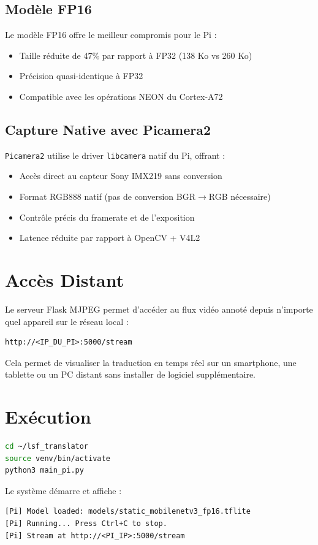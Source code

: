 \subsection{Modèle FP16}

Le modèle FP16 offre le meilleur compromis pour le Pi :
\begin{itemize}
    \item Taille réduite de 47\% par rapport à FP32 (138 Ko vs 260 Ko)
    \item Précision quasi-identique à FP32
    \item Compatible avec les opérations NEON du Cortex-A72
\end{itemize}

\subsection{Capture Native avec Picamera2}

\texttt{Picamera2} utilise le driver \texttt{libcamera} natif du Pi, offrant :
\begin{itemize}
    \item Accès direct au capteur Sony IMX219 sans conversion
    \item Format RGB888 natif (pas de conversion BGR$\rightarrow$RGB nécessaire)
    \item Contrôle précis du framerate et de l'exposition
    \item Latence réduite par rapport à OpenCV + V4L2
\end{itemize}

\section{Accès Distant}

Le serveur Flask MJPEG permet d'accéder au flux vidéo annoté depuis n'importe quel appareil sur le réseau local :

\begin{verbatim}
http://<IP_DU_PI>:5000/stream
\end{verbatim}

Cela permet de visualiser la traduction en temps réel sur un smartphone, une tablette ou un PC distant sans installer de logiciel supplémentaire.

\section{Exécution}

\begin{lstlisting}[style=python, caption={Lancement sur Raspberry Pi}, language=bash]
cd ~/lsf_translator
source venv/bin/activate
python3 main_pi.py
\end{lstlisting}

Le système démarre et affiche :
\begin{verbatim}
[Pi] Model loaded: models/static_mobilenetv3_fp16.tflite
[Pi] Running... Press Ctrl+C to stop.
[Pi] Stream at http://<PI_IP>:5000/stream
\end{verbatim}
